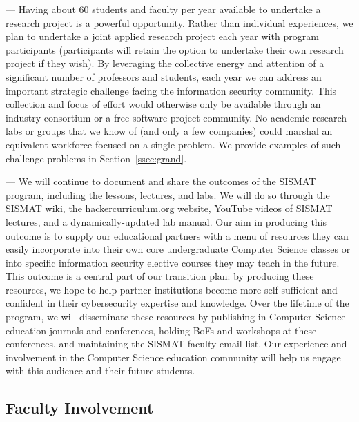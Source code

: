  ---
Having about 60 students and faculty per year available to undertake a
research project is a powerful opportunity.  Rather than individual
experiences, we plan to undertake a joint applied research project
each year with program participants (participants will retain the
option to undertake their own research project if they wish).  By
leveraging the collective energy and attention of a significant number
of professors and students, each year we can address an important
strategic challenge facing the information security community.  This
collection and focus of effort would otherwise only be available
through an industry consortium or a free software project community.
No academic research labs or groups that we know of (and only a few
companies) could marshal an equivalent workforce focused on a single
problem.  We provide examples of such challenge problems in
Section~\ref{ssec:grand}.

 --- We will
continue to document and share the outcomes of the SISMAT program,
including the lessons, lectures, and labs.  We will do so through the
SISMAT wiki, the hackercurriculum.org website, YouTube videos of
SISMAT lectures, and a dynamically-updated lab manual.  Our aim in
producing this outcome is to supply our educational partners with a
menu of resources they can easily incorporate into their own core
undergraduate Computer Science classes or into specific information
security elective courses they may teach in the future.  This outcome
is a central part of our transition plan: by producing these
resources, we hope to help partner institutions become more
self-sufficient and confident in their cybersecurity expertise and
knowledge.  Over the lifetime of the program, we will disseminate
these resources by publishing in Computer Science education journals
and conferences, holding BoFs and workshops at these conferences, and
maintaining the SISMAT-faculty email list.  Our experience and
involvement in the Computer Science education community will help us
engage with this audience and their future students.

\subsection{Faculty Involvement}
\label{ssec:fac}

